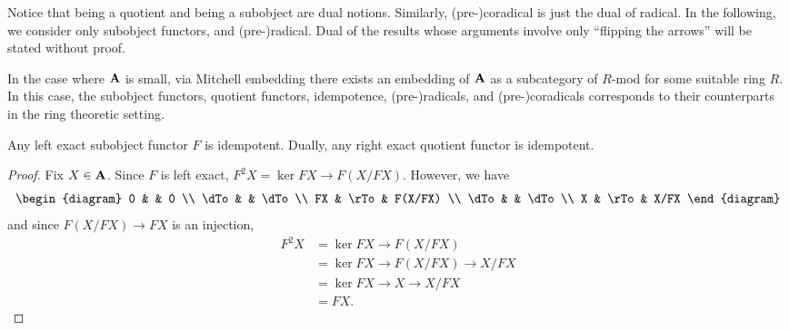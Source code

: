 \begin{rmk}
Notice that being a quotient and being a subobject are dual 
notions. Similarly, (pre-)coradical is just the dual of radical. 
In the following, we consider only subobject functors, and 
(pre-)radical. Dual of the results whose arguments involve only 
``flipping the arrows'' will be stated without proof.
\end{rmk}

\begin{rmk}
In the case where $\mathbf{A}$ is small, via Mitchell embedding 
there exists an embedding of $\mathbf{A}$ as a subcategory of $R$-mod
for some suitable ring $R$. In this case, the subobject functors, 
quotient functors, idempotence, (pre-)radicals, and (pre-)coradicals
corresponds to their counterparts in the ring theoretic setting.
\end{rmk}

\begin{prop}
Any left exact subobject functor $F$ is idempotent. Dually, any
right exact quotient functor is idempotent.
\end{prop}
\begin{proof}
Fix $X \in \mathbf{A}$. Since $F$ is left exact, $F^2X = \ker FX \to 
F(X/FX)$.
However, we have
\[
\begin{diagram}
0    &      & 0       \\
\dTo &      & \dTo    \\
FX   & \rTo & F(X/FX) \\
\dTo &      & \dTo    \\
X    & \rTo & X/FX
\end{diagram}
\]
and since $F(X/FX) \to FX$ is an injection,
\begin{align*}
F^2X &= \ker FX \to F(X/FX) \\
     &= \ker FX \to F(X/FX) \to X/FX \\
     &= \ker FX \to X \to X/FX \\
     &= FX.
\end{align*}
\end{proof}

